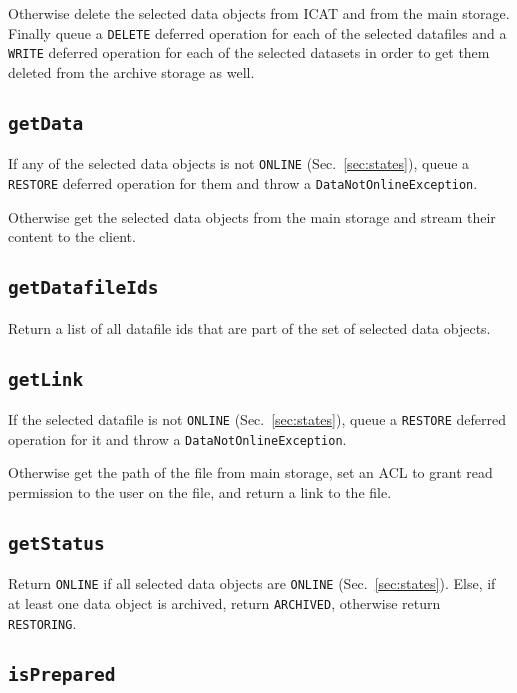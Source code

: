 \documentclass[paper=a4]{scrartcl}
\begin{document}
Otherwise delete the selected data objects from ICAT and from the main
storage.  Finally queue a \texttt{DELETE} deferred operation for each
of the selected datafiles and a \texttt{WRITE} deferred operation for
each of the selected datasets in order to get them deleted from the
archive storage as well.

\subsection{\texttt{getData}}
\label{sec:requests:getdata}

If any of the selected data objects is not \texttt{ONLINE}
(Sec.\ \ref{sec:states}), queue a \texttt{RESTORE} deferred operation
for them and throw a \texttt{DataNotOnlineException}.

Otherwise get the selected data objects from the main storage and
stream their content to the client.

\subsection{\texttt{getDatafileIds}}

Return a list of all datafile ids that are part of the set of
selected data objects.

\subsection{\texttt{getLink}}
\label{sec:requests:getlink}

If the selected datafile is not \texttt{ONLINE}
(Sec.\ \ref{sec:states}), queue a \texttt{RESTORE} deferred operation
for it and throw a \texttt{DataNotOnlineException}.

Otherwise get the path of the file from main storage, set an ACL to
grant read permission to the user on the file, and return a link to
the file.

\subsection{\texttt{getStatus}}

Return \texttt{ONLINE} if all selected data objects are
\texttt{ONLINE} (Sec.\ \ref{sec:states}).  Else, if at least one data
object is archived, return \texttt{ARCHIVED}, otherwise return
\texttt{RESTORING}.

\subsection{\texttt{isPrepared}}
\end{document}
